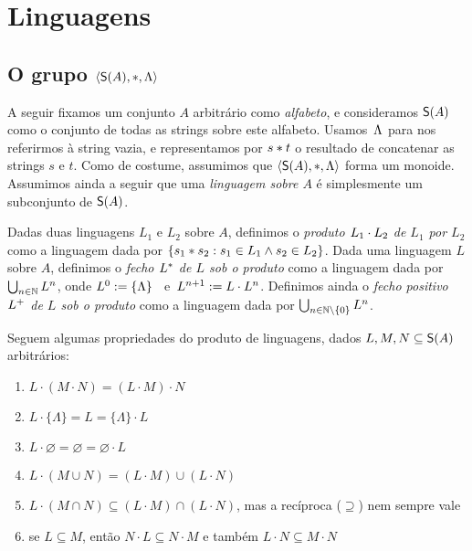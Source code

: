 \section{Linguagens}
\subsection{O grupo $\langle \mathsf{S}(A),*,\Lambda \rangle$} \label{sec:langsec1}

\noindent
A seguir fixamos um conjunto $A$ arbitrário como \textsl{alfabeto}, e consideramos $\mathsf{S}(A)$ como o conjunto de todas as strings sobre este alfabeto.  Usamos~$\Lambda$ para nos referirmos à string vazia, e representamos por $s * t$ o resultado de concatenar as strings $s$ e $t$. Como de costume, assumimos que $\langle \mathsf{S}(A),*,\Lambda \rangle$ forma um monoide.  Assumimos ainda a seguir que uma \textsl{linguagem sobre $A$} é simplesmente um subconjunto de $\mathsf{S}(A)$.

\begin{defin}
	Dadas duas linguagens $L_1$ e $L_2$ sobre $A$, definimos o \textsl{produto $L_1 \cdot L_2$ de $L_1$ por $L_2$} como a linguagem dada por $\{ s_1 * s_2 : s_1 \in L_1 \land s_2 \in L_2 \}$. Dada uma linguagem $L$ sobre $A$, definimos o \textsl{fecho $L^*$ de $L$ sob o produto} como a linguagem dada por $\bigcup_{n\in\mathbb{N}}{L^n}$, onde $L^0:=\{ \Lambda \}$~ e~$L^{n+1}:=L \cdot L^{n}$.  Definimos ainda o \textsl{fecho positivo $L^+$ de $L$ sob o produto} como a linguagem dada por $\bigcup_{n\in\mathbb{N}\setminus\{ 0 \}}{L^n}$.
\end{defin}

Seguem algumas propriedades do produto de linguagens, dados $L,M,N\subseteq \mathsf{S}(A)$ arbitrários:
\begin{enumerate}[label=(\alph*)]
	
	\item\label{prod-assoc} 
	$L\cdot(M\cdot N)=(L\cdot M)\cdot N$
	
	\item\label{prod-strvazia} 
	$L\cdot\{\Lambda\}=L=\{\Lambda\}\cdot L$
	
	\item\label{prod-conjvazio} 
	$L\cdot\varnothing=\varnothing=\varnothing\cdot L$
	
	\item\label{prod-uniao} 
	$L\cdot (M\cup N)=(L\cdot M)\cup(L\cdot N)$
	
	\item\label{prod-intersecao}
	$L\cdot(M\cap N)\subseteq (L\cdot M)\cap(L\cdot N)$, mas a recíproca ($\supseteq$) nem sempre vale
	
	\item\label{prod-monot}
	se $L\subseteq M$, então $N\cdot L\subseteq N\cdot M$ e também $L\cdot N\subseteq M\cdot N$
	
\end{enumerate}


